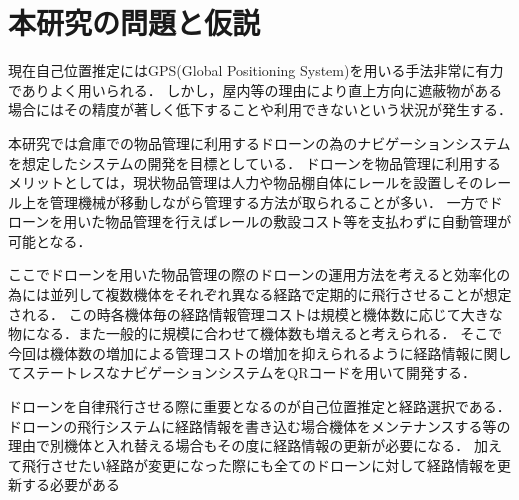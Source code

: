\section{本研究の問題と仮説}
現在自己位置推定にはGPS(Global Positioning System)を用いる手法非常に有力でありよく用いられる．
しかし，屋内等の理由により直上方向に遮蔽物がある場合にはその精度が著しく低下することや利用できないという状況が発生する．

本研究では倉庫での物品管理に利用するドローンの為のナビゲーションシステムを想定したシステムの開発を目標としている．
ドローンを物品管理に利用するメリットとしては，現状物品管理は人力や物品棚自体にレールを設置しそのレール上を管理機械が移動しながら管理する方法が取られることが多い．
一方でドローンを用いた物品管理を行えばレールの敷設コスト等を支払わずに自動管理が可能となる．

ここでドローンを用いた物品管理の際のドローンの運用方法を考えると効率化の為には並列して複数機体をそれぞれ異なる経路で定期的に飛行させることが想定される．
この時各機体毎の経路情報管理コストは規模と機体数に応じて大きな物になる．また一般的に規模に合わせて機体数も増えると考えられる．
そこで今回は機体数の増加による管理コストの増加を抑えられるように経路情報に関してステートレスなナビゲーションシステムをQRコードを用いて開発する．

ドローンを自律飛行させる際に重要となるのが自己位置推定と経路選択である．
ドローンの飛行システムに経路情報を書き込む場合機体をメンテナンスする等の理由で別機体と入れ替える場合もその度に経路情報の更新が必要になる．
加えて飛行させたい経路が変更になった際にも全てのドローンに対して経路情報を更新する必要がある